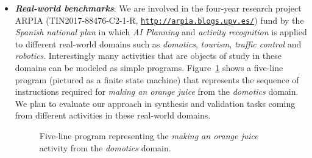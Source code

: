 \documentclass[10pt,a4paper]{paper}
\begin{document}
\begin{itemize}
  
\item {\bf\em Real-world benchmarks}: We are involved in the four-year research project {\sc ARPIA} (TIN2017-88476-C2-1-R, {\tt\small\url{http://arpia.blogs.upv.es/}}) fund by the {\em Spanish national plan} in which {\em AI Planning} and {\em activity recognition} is applied to different real-world domains such as {\em domotics}, {\em tourism}, {\em traffic control} and {\em robotics}. Interestingly many activities that are objects of study in these domains can be modeled as simple programs. Figure~\ref{fig:activity} shows a five-line program (pictured as a finite state machine) that represents the sequence of instructions required for {\em making an orange juice} from the {\em domotics} domain. We plan to evaluate our approach in synthesis and validation tasks coming from different activities in these real-world domains. 

\begin{figure}[hbt!]
  \begin{center}
      \begin{scriptsize}   
     \end{scriptsize}            
\end{center}
\caption{\small Five-line program representing the {\em making an orange juice} activity from the {\em domotics} domain.}
\label{fig:activity}
\end{figure}
\end{itemize}
\end{document}
